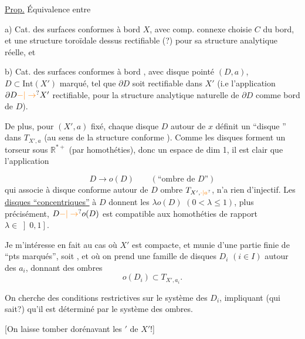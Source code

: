 \uline{Prop.} Équivalence entre 


a) Cat. des surfaces conformes à bord $X$, avec comp. connexe  choisie $C$ du bord, et une structure toroïdale dessus rectifiable (?) pour sa structure analytique réelle, et

b) Cat. des surfaces conformes à bord , avec  disque pointé $(D,a)$, $D\subset\mathrm{Int}(X')$ marqué, tel que $\partial D$ soit rectifiable dans $X'$ (i.e l'application $\partial D\unsure{-|\to}X'$ rectifiable, pour la structure analytique naturelle de $\partial D$ comme bord de $D$).

De plus, pour $(X',a)$ fixé, chaque disque $D$ autour de $x$ définit un ``disque  '' dans $T_{X',a}$ (au sens de la structure  conforme ). Comme les disques forment un torseur sous $\mathbb R^{*+}$ (par homothéties), donc un espace de dim 1, il est clair que l'application


\[
D\longrightarrow o(D)\qquad (\text{``ombre de }D\text{''})
\]
qui associe à  disque conforme autour de $D$  ombre  $T_{X',\unsure{\cdot|a}}$, n'a rien d'injectif. Les \uline{disques ``concentriques''} à $D$ donnent les $\lambda o(D)$ $(0<\lambda\leq1)$, plus précisément, $D\unsure{-|\to}o(D)$ est compatible aux homothéties de rapport  $\lambda\in\left]0,1\right]$.

Je m'intéresse en fait au cas où $X'$ est compacte, et munie d'une  partie finie de ``pts marqués'', soit , et où on prend une famille de disques $D_i$ $(i\in I)$  autour des $a_i$, donnant des ombres
\[
o(D_i)\subset T_{X',a_i}.
\]

On cherche des conditions restrictives  sur le système des $D_i$, impliquant (qui sait?) qu'il est déterminé par le système des ombres.


[On laisse tomber dorénavant les $'$ de $X'$!]

